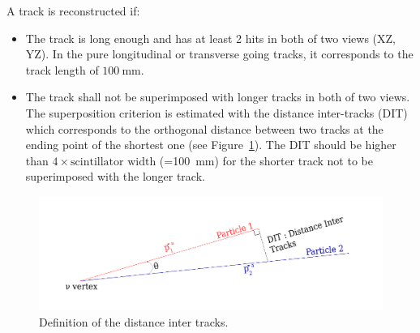 A track is reconstructed if:
\begin{itemize}
\item The track is long enough and has at least 2 hits in both of two views (XZ, YZ).
  In the pure longitudinal or transverse going tracks, it corresponds to the track length of $100~$mm.
\item The track shall not be superimposed with longer tracks in both of two views. The superposition criterion is estimated with the distance inter-tracks (DIT) which corresponds to the orthogonal distance between two tracks at the ending point of the shortest one (see Figure~\ref{fig:DIT}). 
The DIT should be higher than $4 \times \text{scintillator width}$ (=100~mm) for the shorter track not to be superimposed with the longer track.
\end{itemize} 
\begin{figure}[htbp]
  \centering
  \includegraphics[width=.7\textwidth]{fig/DistanceInterTracks.pdf}
  \caption{\label{fig:DIT} Definition of the distance inter tracks.}
\end{figure}

